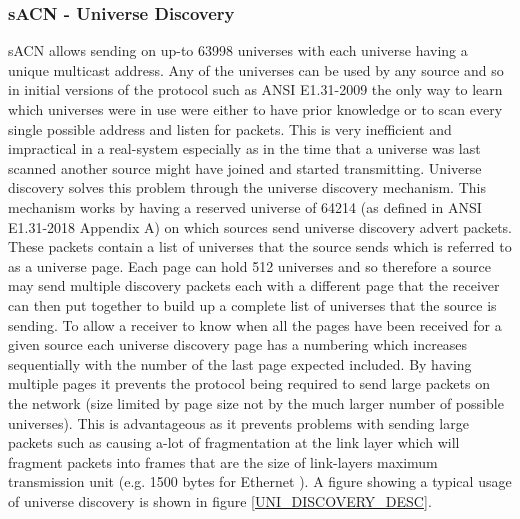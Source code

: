 \documentclass[11pt,a4paper]{article}
\begin{document}
\subsubsection{sACN - Universe Discovery}
sACN allows sending on up-to 63998 universes with each universe having a unique multicast address. Any of the universes can be used by any source and so in initial versions of the protocol such as ANSI E1.31-2009 \cite{ANSI_E1.31_2009} the only way to learn which universes were in use were either to have prior knowledge or to scan every single possible address and listen for packets. This is very inefficient and impractical in a real-system especially as in the time that a universe was last scanned another source might have joined and started transmitting. Universe discovery solves this problem through the universe discovery mechanism. This mechanism works by having a reserved universe of 64214 (as defined in ANSI E1.31-2018 Appendix A) on which sources send universe discovery advert packets. These packets contain a list of universes that the source sends which is referred to as a universe page. Each page can hold 512 universes and so therefore a source may send multiple discovery packets each with a different page that the receiver can then put together to build up a complete list of universes that the source is sending. To allow a receiver to know when all the pages have been received for a given source each universe discovery page has a numbering which increases sequentially with the number of the last page expected included. By having multiple pages it prevents the protocol being required to send large packets on the network (size limited by page size not by the much larger number of possible universes). This is advantageous as it prevents problems with sending large packets such as causing a-lot of fragmentation at the link layer which will fragment packets into frames that are the size of link-layers maximum transmission unit (e.g. 1500 bytes for Ethernet \cite{ETHERNET_MTU}). A figure showing a typical usage of universe discovery is shown in figure \ref{UNI_DISCOVERY_DESC}. 
\end{document}
